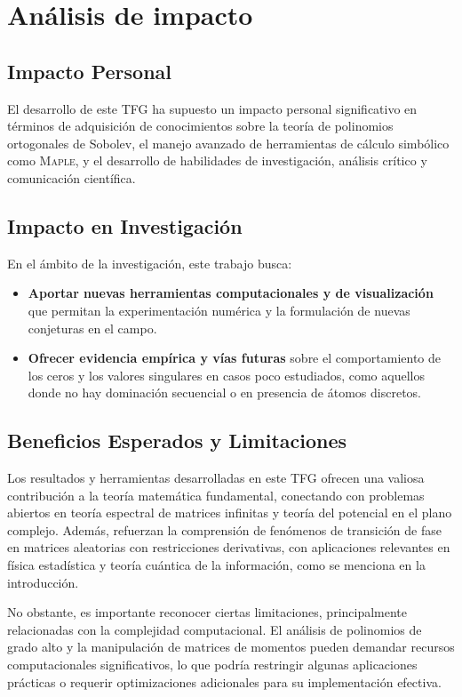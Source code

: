 \chapter{Análisis de impacto}

\section{Impacto Personal}
El desarrollo de este TFG ha supuesto un impacto personal significativo en términos de adquisición de conocimientos sobre la teoría de polinomios ortogonales de Sobolev, el manejo avanzado de herramientas de cálculo simbólico como \textsc{Maple}, y el desarrollo de habilidades de investigación, análisis crítico y comunicación científica.

\section{Impacto en Investigación}
En el ámbito de la investigación, este trabajo busca:
\begin{itemize}
  \item \textbf{Aportar nuevas herramientas computacionales y de visualización} que permitan la experimentación numérica y la formulación de nuevas conjeturas en el campo.
  \item \textbf{Ofrecer evidencia empírica y vías futuras} sobre el comportamiento de los ceros y los valores singulares en casos poco estudiados, como aquellos donde no hay dominación secuencial o en presencia de átomos discretos.
\end{itemize}

\section{Beneficios Esperados y Limitaciones}
Los resultados y herramientas desarrolladas en este TFG ofrecen una valiosa contribución a la teoría matemática fundamental, conectando con problemas abiertos en teoría espectral de matrices infinitas y teoría del potencial en el plano complejo. Además, refuerzan la comprensión de fenómenos de transición de fase en matrices aleatorias con restricciones derivativas, con aplicaciones relevantes en física estadística y teoría cuántica de la información, como se menciona en la introducción.

No obstante, es importante reconocer ciertas limitaciones, principalmente relacionadas con la complejidad computacional. El análisis de polinomios de grado alto y la manipulación de matrices de momentos pueden demandar recursos computacionales significativos, lo que podría restringir algunas aplicaciones prácticas o requerir optimizaciones adicionales para su implementación efectiva.

